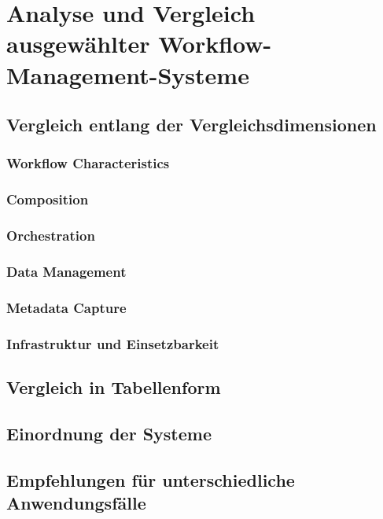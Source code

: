 %

\chapter{Analyse und Vergleich ausgewählter Workflow-Management-Systeme}
\label{sec:analysis}

\section{Vergleich entlang der Vergleichsdimensionen}
\label{sec:analysis:criteria-based}

\subsection{Workflow Characteristics}
\label{sec:analysis:workflow-characteristics}

\subsection{Composition}
\label{sec:analysis:composition}

\subsection{Orchestration}
\label{sec:analysis:orchestration}

\subsection{Data Management}
\label{sec:analysis:data-management}

\subsection{Metadata Capture}
\label{sec:analysis:metadata-capture}

\subsection{Infrastruktur und Einsetzbarkeit}
\label{sec:analysis:infrastructure-usability}

\section{Vergleich in Tabellenform}
\label{sec:analysis:table-comparison}

\section{Einordnung der Systeme}
\label{sec:analysis:system-classification}

\section{Empfehlungen für unterschiedliche Anwendungsfälle}
\label{sec:analysis:recommendations}

